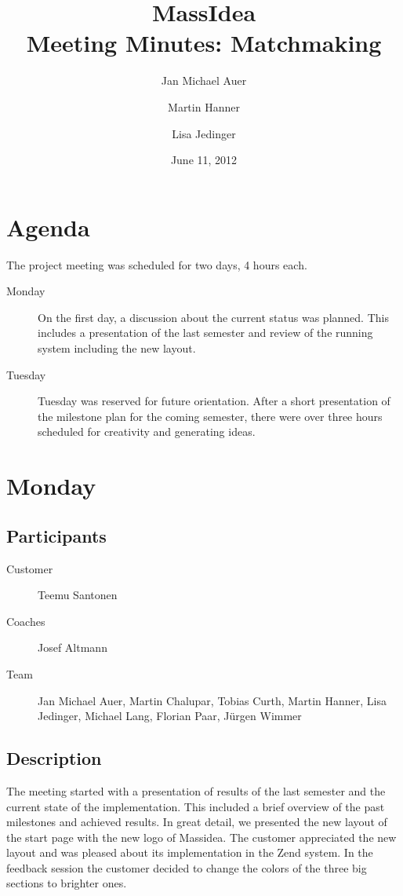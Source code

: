 \documentclass[a4paper,oneside,titlepage]{article}
\title{MassIdea \\ Meeting Minutes: Matchmaking}
\author{Jan Michael Auer \and Martin Hanner \and Lisa Jedinger}
\date{June 11, 2012}
\begin{document}
\maketitle
	
\tableofcontents
\vspace{5\baselineskip}	
\section{Agenda}
	
The project meeting was scheduled for two days, 4 hours each. 

\begin{description}
	\item[Monday] On the first day, a discussion about the current status was planned. This includes a presentation of the last semester and review of the running system including the new layout.
	\item[Tuesday] Tuesday was reserved for future orientation. After a short presentation of the milestone plan for the coming semester, there were over three hours scheduled for creativity and generating ideas.
\end{description}

\pagebreak

\section{Monday}

\subsection{Participants}

\begin{description}
	\item[Customer] Teemu Santonen
	\item[Coaches] Josef Altmann
	\item[Team] Jan Michael Auer, Martin Chalupar, Tobias Curth, Martin Hanner, Lisa Jedinger, Michael Lang, Florian Paar, Jürgen Wimmer
\end{description}

\subsection{Description}

The meeting started with a presentation of results of the last semester and the current state of the implementation. This included a brief overview of the past milestones and achieved results.
In great detail, we presented the new layout of the start page with the new logo of Massidea. The customer appreciated the new layout and was pleased about its implementation in the Zend system. In the feedback session the customer decided to change the colors of the three big sections to brighter ones.
\end{document}
